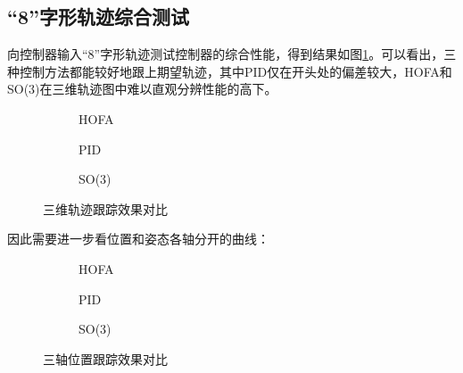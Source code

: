 \subsection*{“8”字形轨迹综合测试}
  向控制器输入“8”字形轨迹测试控制器的综合性能，得到结果如图\ref{matlab_3d}。可以看出，三种控制方法都能较好地跟上期望轨迹，其中PID仅在开头处的偏差较大，HOFA和SO(3)在三维轨迹图中难以直观分辨性能的高下。
  \begin{figure}[!h]
      \centering
      \begin{subfigure}[t]{0.33\textwidth}
        \centering
        \caption{HOFA}
      \end{subfigure}\hfill
      \begin{subfigure}[t]{0.33\textwidth}
        \centering
        \caption{PID}
      \end{subfigure}\hfill
      \begin{subfigure}[t]{0.33\textwidth}
        \centering
        \caption{SO(3)}
      \end{subfigure}
      \caption{三维轨迹跟踪效果对比}
      \label{matlab_3d}
  \end{figure}
  因此需要进一步看位置和姿态各轴分开的曲线：
  \begin{figure}[!h]
    \centering
    \begin{subfigure}[t]{0.33\textwidth}
      \centering
      \caption{HOFA}
    \end{subfigure}\hfill
    \begin{subfigure}[t]{0.33\textwidth}
      \centering
      \caption{PID}
    \end{subfigure}\hfill
    \begin{subfigure}[t]{0.33\textwidth}
      \centering
      \caption{SO(3)}
    \end{subfigure}
    \caption{三轴位置跟踪效果对比}
    \label{matlab_x}
\end{figure}

